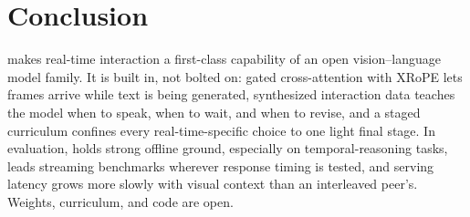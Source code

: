 \section{Conclusion}\label{sec:conclusion}

\mossvl{} makes real-time interaction a first-class capability of an
open vision--language model family. It is built in, not bolted on:
gated cross-attention with XRoPE lets frames arrive while text is
being generated, synthesized interaction data teaches the model when
to speak, when to wait, and when to revise, and a staged curriculum
confines every real-time-specific choice to one light final stage. In
evaluation, \mossinstruct{} holds strong offline ground, especially
on temporal-reasoning tasks, \mossrealtime{} leads streaming
benchmarks wherever response timing is tested, and serving
latency grows more slowly with visual context than an interleaved
peer's.
Weights, curriculum, and code are open.
